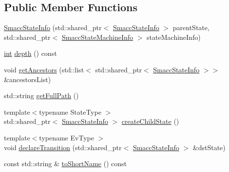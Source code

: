 \subsection*{Public Member Functions}
\begin{DoxyCompactItemize}
\item 
\hyperlink{classsmacc_1_1SmaccStateInfo_a2be1e3db5d31a7e2491a25eafc87671e}{Smacc\+State\+Info} (std\+::shared\+\_\+ptr$<$ \hyperlink{classsmacc_1_1SmaccStateInfo}{Smacc\+State\+Info} $>$ parent\+State, std\+::shared\+\_\+ptr$<$ \hyperlink{classsmacc_1_1SmaccStateMachineInfo}{Smacc\+State\+Machine\+Info} $>$ state\+Machine\+Info)
\item 
\hyperlink{classint}{int} \hyperlink{classsmacc_1_1SmaccStateInfo_a2abede9fd08d8954c3e392a053d50533}{depth} () const 
\item 
void \hyperlink{classsmacc_1_1SmaccStateInfo_aca52fb4c1c3f5f35e3292bd7d6d6c66d}{get\+Ancestors} (std\+::list$<$ std\+::shared\+\_\+ptr$<$ \hyperlink{classsmacc_1_1SmaccStateInfo}{Smacc\+State\+Info} $>$$>$ \&ancestors\+List)
\item 
std\+::string \hyperlink{classsmacc_1_1SmaccStateInfo_a22e625806a74808ee272df5c034d122e}{get\+Full\+Path} ()
\item 
{\footnotesize template$<$typename State\+Type $>$ }\\std\+::shared\+\_\+ptr$<$ \hyperlink{classsmacc_1_1SmaccStateInfo}{Smacc\+State\+Info} $>$ \hyperlink{classsmacc_1_1SmaccStateInfo_a1c935c77640d496f22f5f48d78ddb296}{create\+Child\+State} ()
\item 
{\footnotesize template$<$typename Ev\+Type $>$ }\\void \hyperlink{classsmacc_1_1SmaccStateInfo_ad5228fe261f574c95b82641699bbf9dd}{declare\+Transition} (std\+::shared\+\_\+ptr$<$ \hyperlink{classsmacc_1_1SmaccStateInfo}{Smacc\+State\+Info} $>$ \&dst\+State)
\item 
const std\+::string \& \hyperlink{classsmacc_1_1SmaccStateInfo_aaf6bc4ece87872a5c0072a5582019e20}{to\+Short\+Name} () const 
\end{DoxyCompactItemize}
